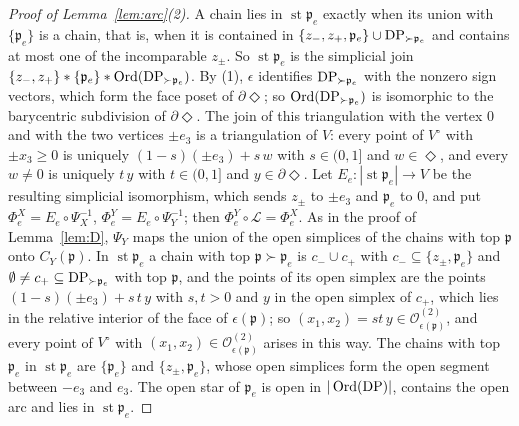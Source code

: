\begin{proof}[Proof of Lemma~\ref{lem:arc}(2)]
A chain lies in $\operatorname{st}{\mathfrak p}_e$ exactly when its union with $\{{\mathfrak p}_e\}$ is a chain, that is, when it is contained in
$\{z_-,z_+,{\mathfrak p}_e\}\cup\mathrm{DP}_{\succ {\mathfrak p}_e}$ and contains at most one of the incomparable $z_\pm$. So $\operatorname{st}{\mathfrak p}_e$ is
the simplicial join $\{z_-,z_+\}*\{{\mathfrak p}_e\}*\operatorname{Ord}(\mathrm{DP}_{\succ {\mathfrak p}_e})$. By (1), $\epsilon$ identifies $\mathrm{DP}_{\succ {\mathfrak p}_e}$ with
the nonzero sign vectors, which form the face poset of $\partial\Diamond$; so $\operatorname{Ord}(\mathrm{DP}_{\succ {\mathfrak p}_e})$ is isomorphic to
the barycentric subdivision of $\partial\Diamond$. The join of this triangulation with the vertex $0$ and with the two
vertices $\pm e_3$ is a triangulation of $V$: every point of $V^\circ$ with $\pm x_3\ge0$ is uniquely $(1-s)(\pm e_3)+s\,w$
with $s\in(0,1]$ and $w\in\Diamond$, and every $w\ne0$ is uniquely $t\,y$ with $t\in(0,1]$ and $y\in\partial\Diamond$. Let
$E_e\colon|\operatorname{st}{\mathfrak p}_e|\to V$ be the resulting simplicial isomorphism, which sends $z_\pm$ to $\pm e_3$ and ${\mathfrak p}_e$ to
$0$, and put $\Phi^X_e=E_e\circ\Psi_X^{-1}$, $\Phi^Y_e=E_e\circ\Psi_Y^{-1}$; then $\Phi^Y_e\circ\mathcal L=\Phi^X_e$. As in the
proof of Lemma~\ref{lem:D}, $\Psi_Y$ maps the union of the open simplices of the chains with top ${\mathfrak p}$ onto $C_Y({\mathfrak p})$. In
$\operatorname{st}{\mathfrak p}_e$ a chain with top ${\mathfrak p}\succ {\mathfrak p}_e$ is $c_-\cup c_+$ with $c_-\subseteq\{z_\pm,{\mathfrak p}_e\}$ and $\emptyset\ne
c_+\subseteq\mathrm{DP}_{\succ {\mathfrak p}_e}$ with top ${\mathfrak p}$, and the points of its open simplex are the points $(1-s)(\pm e_3)+s\,t\,y$ with
$s,t>0$ and $y$ in the open simplex of $c_+$, which lies in the relative interior of the face of $\epsilon({\mathfrak p})$; so
$(x_1,x_2)=st\,y\in\mathcal O^{(2)}_{\epsilon({\mathfrak p})}$, and every point of $V^\circ$ with $(x_1,x_2)\in\mathcal
O^{(2)}_{\epsilon({\mathfrak p})}$ arises in this way. The chains with top ${\mathfrak p}_e$ in $\operatorname{st}{\mathfrak p}_e$ are $\{{\mathfrak p}_e\}$ and
$\{z_\pm,{\mathfrak p}_e\}$, whose open simplices form the open segment between $-e_3$ and $e_3$. The open star of ${\mathfrak p}_e$ is open in
$|\operatorname{Ord}(\mathrm{DP})|$, contains the open arc and lies in $\operatorname{st}{\mathfrak p}_e$.
\end{proof}

